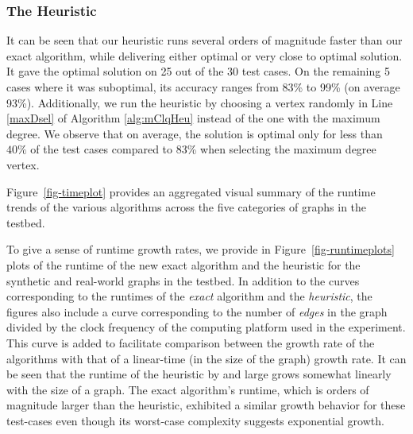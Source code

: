 \subsubsection{The Heuristic}
\label{sec:exp-heuristic}

It can be seen that our heuristic runs several orders of magnitude faster than our exact algorithm,
while delivering either optimal or very close to optimal solution.
It gave the optimal solution on 25 out of the 30 test cases.
On the remaining 5 cases where it was suboptimal, its accuracy ranges from 83\% to 99\% (on average 93\%).
Additionally, we run the heuristic by choosing a vertex randomly in Line \ref{maxDsel} of Algorithm \ref{alg:mClqHeu} instead of the one with the maximum degree. We observe that on average, the solution is optimal only for less than $40\%$ of the test cases compared to 83\% when selecting the maximum degree vertex.

Figure~\ref{fig-timeplot} provides an aggregated visual summary of the runtime trends of
the various algorithms across the five categories of graphs in the testbed. 


To give a sense of runtime growth rates, we provide in Figure~\ref{fig-runtimeplots} plots of the 
runtime of the new exact algorithm and the heuristic for the synthetic and real-world graphs 
in the testbed. In addition to the curves corresponding to the runtimes of the
{\em exact} algorithm and the {\em heuristic}, the figures also include a curve corresponding to
the number of {\em edges} in the graph divided by the clock frequency of the computing
platform used in the experiment. This curve is added to facilitate comparison between
the growth rate of the algorithms with that of a linear-time (in the size of the graph) growth rate. 
It can be seen that the runtime of the heuristic by and large grows 
somewhat linearly with the size of a graph. The exact algorithm's runtime, which is orders of
magnitude larger than the heuristic, exhibited a similar growth behavior for these test-cases
even though its worst-case complexity suggests exponential growth. 

